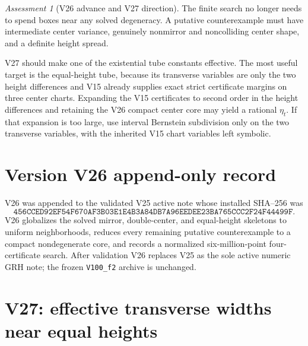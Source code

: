 \documentclass[11pt]{article}
\theoremstyle{definition}
\theoremstyle{remark}
\newtheorem{assessment}[theorem]{Assessment}
\begin{document}
\begin{assessment}[V26 advance and V27 direction]
\label{ass:f2v26}
The finite search no longer needs to spend boxes near any solved
degeneracy.  A putative counterexample must have intermediate center
variance, genuinely nonmirror and noncolliding center shape, and a
definite height spread.

V27 should make one of the existential tube constants effective.  The
most useful target is the equal-height tube, because its transverse
variables are only the two height differences and V15 already supplies
exact strict certificate margins on three center charts.  Expanding the
V15 certificates to second order in the height differences and retaining
the V26 compact center core may yield a rational \(\eta_t\).  If that
expansion is too large, use interval Bernstein subdivision only on the
two transverse variables, with the inherited V15 chart variables left
symbolic.
\end{assessment}

\section*{Version V26 append-only record}

V26 was appended to the validated V25 active note whose installed
SHA--256 was
\[
 \texttt{456CCED92EF54F670AF3B03E1E4B3A84DB7A96EEDEE23BA765CCC2F24F44499F}.
 \tag{N26.26}
\]
V26 globalizes the solved mirror, double-center, and equal-height
skeletons to uniform neighborhoods, reduces every remaining putative
counterexample to a compact nondegenerate core, and records a normalized
six-million-point four-certificate search.  After validation V26 replaces
V25 as the sole active numeric GRH note; the frozen
\texttt{V100\_f2} archive is unchanged.



\section{V27: effective transverse widths near equal heights}
\label{sec:f2v27-effective-height}
\end{document}
